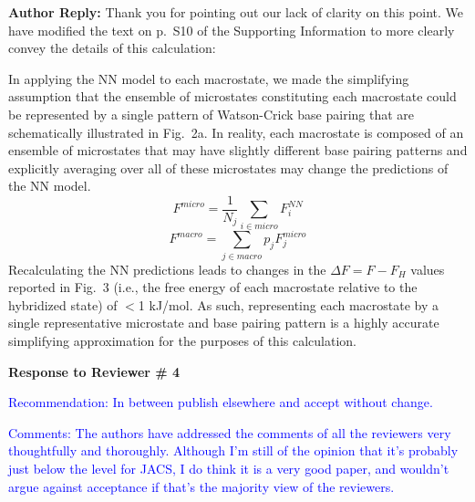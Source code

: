 \documentclass[11pt,a4paper]{letter} %
\newcommand*{\rood}[1]{{#1}}
\newcommand*{\roodr}[1]{{\color{red}{#1}}}
\begin{document}
\textbf{Author Reply:} Thank you for pointing out our lack of clarity on this point. We have modified the text on p.~S10 of the Supporting Information to more clearly convey the details of this calculation:

\rood{In applying the NN model to each macrostate, we made the simplifying assumption that the ensemble of microstates constituting each macrostate could be represented by a single pattern of Watson-Crick base pairing that are schematically illustrated in Fig.~2a. In reality, each macrostate is composed of an ensemble of microstates that may have slightly different base pairing patterns and explicitly averaging over all of these microstates may change the predictions of the NN model.} \roodr{To evaluate the extent to which the microstate ensembles would change our free energy estimates, we calculated a NN microstate free energy by taking a simple average over the NN free energies predicted for each configuration within a given microstate -- a reasonable assumption given the structural similarity of configurations within a microstate -- then computing macrostate free energies via a weighted average according to the MSM equilibrium occupancy probabilities for each microstate. These operations can be represented as follows, where $i$ indexes over the $N_j$ configurations in microstate $j$, $j$ indexes over microstates, and $p_j$ represents the MSM equilibrium occupancy of microstate $j$,}
\begin{equation}
    F^{micro} = \frac{1}{N_j} \sum_{i \in micro} F_i^{NN} 
\end{equation}
\begin{equation}  
    F^{macro} = \sum_{j \in macro} p_j F_j^{micro}
\end{equation}
Recalculating the NN predictions \roodr{in this way} leads to changes in the $\Delta F = F - F_H$ values reported in Fig.~3 (i.e., the free energy of each macrostate relative to the hybridized state) of $<$1 kJ/mol. As such, representing each macrostate by a single representative microstate and base pairing pattern is a highly accurate simplifying approximation for the purposes of this calculation.



\begin{shaded}
\textbf{Response to Reviewer \# 4}
\end{shaded}

\textcolor{blue}{Recommendation: In between publish elsewhere and accept without change.
}

\textcolor{blue}{Comments:
The authors have addressed the comments of all the reviewers very thoughtfully and thoroughly. Although I'm still of the opinion that it's probably just below the level for JACS, I do think it is a very good paper, and wouldn't argue against acceptance if that's the majority view of the reviewers.
}
\end{document}
